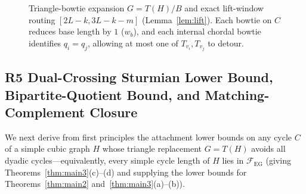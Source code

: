 \documentclass[11pt,reqno]{amsart}
\theoremstyle{plain}
\theoremstyle{definition}
\theoremstyle{remark}
\newcommand{\FEG}{\mathcal{F}_{\mathrm{EG}}}
\DeclareRobustCommand{\_}{\ifmmode\text{\textunderscore}\else\textunderscore\allowbreak\fi}
\begin{document}
\begin{figure}[t]
\caption{Triangle-bowtie expansion $G = T(H)/B$ and exact lift-window routing $[2L-k, 3L-k-m]$ (Lemma~\ref{lem:lift}). Each bowtie on $C$ reduces base length by $1$ ($w_b$), and each internal chordal bowtie identifies $q_i = q_j$, allowing at most one of $T_{v_i}, T_{v_j}$ to detour.}\label{fig:lift}
\end{figure}

\subsection{R5 Dual-Crossing Sturmian Lower Bound, Bipartite-Quotient Bound, and Matching-Complement Closure}\label{subsec:r5}

We next derive from first principles the attachment lower bounds on any cycle $C$ of a simple cubic graph $H$ whose triangle replacement $G = T(H)$ avoids all dyadic cycles---equivalently, every simple cycle length of $H$ lies in $\FEG$ (giving Theorems~\ref{thm:main3}(c)--(d) and supplying the lower bounds for Theorems~\ref{thm:main2} and~\ref{thm:main3}(a)--(b)).
\end{document}
